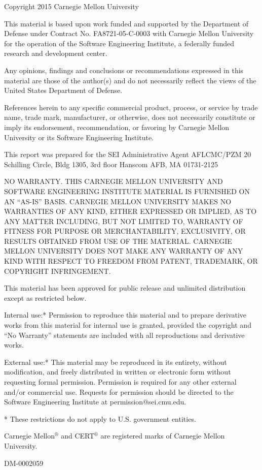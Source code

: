 Copyright 2015 Carnegie Mellon University

This material is based upon work funded and supported by the Department of Defense under Contract No. FA8721-05-C-0003 with Carnegie Mellon University for the operation of the Software Engineering Institute, a federally funded research and development center.

Any opinions, findings and conclusions or recommendations expressed in this material are those of the author(s) and do not necessarily reflect the views of the United States Department of Defense.

References herein to any specific commercial product, process, or service by trade name, trade mark, manufacturer, or otherwise, does not necessarily constitute or imply its endorsement, recommendation, or favoring by Carnegie Mellon University or its Software Engineering Institute.

This report was prepared for the
SEI Administrative Agent
AFLCMC/PZM
20 Schilling Circle, Bldg 1305, 3rd floor
Hanscom AFB, MA 01731-2125

NO WARRANTY. THIS CARNEGIE MELLON UNIVERSITY AND SOFTWARE ENGINEERING INSTITUTE MATERIAL IS FURNISHED ON AN “AS-IS” BASIS. CARNEGIE MELLON UNIVERSITY MAKES NO WARRANTIES OF ANY KIND, EITHER EXPRESSED OR IMPLIED, AS TO ANY MATTER INCLUDING, BUT NOT LIMITED TO, WARRANTY OF FITNESS FOR PURPOSE OR MERCHANTABILITY, EXCLUSIVITY, OR RESULTS OBTAINED FROM USE OF THE MATERIAL. CARNEGIE MELLON UNIVERSITY DOES NOT MAKE ANY WARRANTY OF ANY KIND WITH RESPECT TO FREEDOM FROM PATENT, TRADEMARK, OR COPYRIGHT INFRINGEMENT.

This material has been approved for public release and unlimited distribution except as restricted below.

Internal use:* Permission to reproduce this material and to prepare derivative works from this material for internal use is granted, provided the copyright and “No Warranty” statements are included with all reproductions and derivative works.

External use:* This material may be reproduced in its entirety, without modification, and freely distributed in written or electronic form without requesting formal permission. Permission is required for any other external and/or commercial use. Requests for permission should be directed to the Software Engineering Institute at permission@sei.cmu.edu.

* These restrictions do not apply to U.S. government entities.

Carnegie Mellon$^\textsf{®}$ and CERT$^\textsf{®}$ are registered marks of Carnegie Mellon University.

DM-0002059

